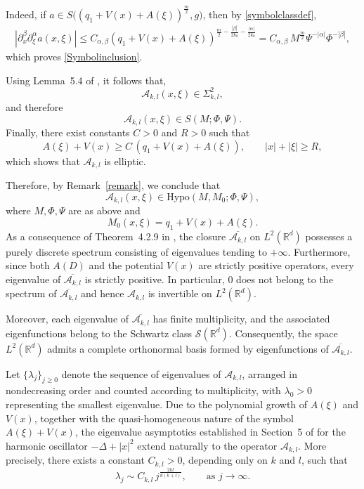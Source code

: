 \documentclass[12pt,reqno,a4paper]{amsart}
\numberwithin{equation}{section}
\theoremstyle{plain}
\theoremstyle{definition}
\theoremstyle{remark}
\def \Ad{\mathcal{A}_{k,l}}
\begin{document}
Indeed, if $a\in S\bigl((q_{1}+V(x)+A(\xi))^{\frac{m}{2}},g\bigr)$, then by \eqref{symbolclassdef},
\begin{align*}
|\partial_x^{\beta}\partial_\xi^{\alpha} a(x,\xi)|
\le
C_{\alpha,\beta}(q_{1}+V(x)+A(\xi))^{\frac{m}{2}-\frac{|\beta|}{2k_0}-\frac{|\alpha|}{2k_0}}
=
C_{\alpha,\beta}\,M^{\frac{m}{2}}\Psi^{-|\alpha|}\Phi^{-|\beta|},
\end{align*}
which proves \eqref{Symbolinclusion}.


Using Lemma~5.4 of \cite{MR4489248}, it follows that,
\[
\mathcal{A}_{k,l}(x,\xi)\in\Sigma^{2}_{k,l},
\]
and therefore
\[
\mathcal{A}_{k,l}(x,\xi)\in S(M;\Phi,\Psi).
\]
Finally, there exist constants $C>0$ and $R>0$ such that
\[
A(\xi)+V(x)
\ge
C\,(q_{1}+V(x)+A(\xi)),
\qquad
|x|+|\xi|\ge R,
\]
which shows that $\Ad$ is elliptic.

Therefore, by Remark~\ref{remark}, we conclude that
\[
\mathcal{A}_{k,l}(x,\xi)\in \mathrm{Hypo}(M,M_{0};\Phi,\Psi),
\]
where $M, \Phi, \Psi$ are as above and 
\[
M_{0}(x,\xi)=q_{1}+V(x)+A(\xi).
\]
As a consequence of Theorem~4.2.9 in \cite{MR2668420}, the closure $\overline{\mathcal{A}_{k,l}}$ on $L^{2}(\mathbb{R}^{d})$ possesses a purely discrete spectrum consisting of eigenvalues tending to $+\infty$. Furthermore, since both $A(D)$ and the potential $V(x)$ are strictly positive operators, every eigenvalue of $\overline{\mathcal{A}_{k,l}}$ is strictly positive. In particular, $0$ does not belong to the spectrum of $\overline{\mathcal{A}_{k,l}}$
and hence $\mathcal{A}_{k,l}$ is invertible on $L^{2}(\mathbb{R}^{d})$.

Moreover, each eigenvalue of $\overline{\mathcal{A}_{k,l}}$ has finite multiplicity, and the associated eigenfunctions belong to the Schwartz class $\mathcal{S}(\mathbb{R}^{d})$. Consequently, the space $L^{2}(\mathbb{R}^{d})$ admits a complete orthonormal basis formed by eigenfunctions of $\overline{\mathcal{A}_{k,l}}$.

Let $\{\lambda_j\}_{j\geq 0}$ denote the sequence of eigenvalues of $\mathcal{A}_{k,l}$, arranged in nondecreasing order and counted according to multiplicity, with $\lambda_0>0$ representing the smallest eigenvalue. Due to the polynomial growth of $A(\xi)$ and $V(x)$, together with the quasi-homogeneous nature of the symbol $A(\xi)+V(x)$, the eigenvalue asymptotics established in Section~5 of \cite{MR4299820} for the harmonic oscillator $-\Delta+|x|^{2}$ extend naturally to the operator $\mathcal{A}_{k,l}$. More precisely, there exists a constant $C_{k,l}>0$, depending only on $k$ and $l$, such that
\begin{equation}
\label{eigenvalueestimate}
\lambda_j
\sim
C_{k,l}\, j^{\frac{2kl}{d(k+l)}},
\qquad \text{as } j\to\infty.
\end{equation}
\end{document}
